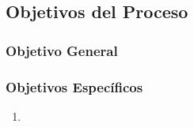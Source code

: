 
\subsection{Objetivos del Proceso} 	%

\subsubsection{Objetivo General}	%

\subsubsection{Objetivos Específicos}	%

\begin{enumerate}[I] 			%
	\item %
\end{enumerate}

